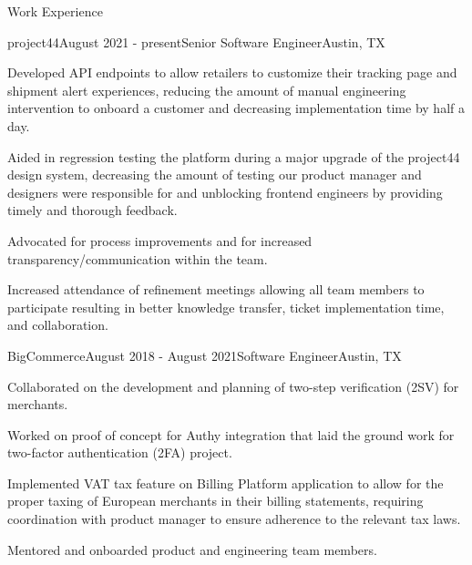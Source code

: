 \documentclass{resume} %
\begin{document}

\begin{rSection}{Work Experience}


\begin{rSubsection}{project44}{August 2021 - present}{Senior Software Engineer}{Austin, TX}
\item Developed API endpoints to allow retailers to customize their tracking page and shipment alert experiences, reducing the
amount of manual engineering intervention to onboard a customer and decreasing implementation time by half a day.
\item Aided in regression testing the platform during a major upgrade of the project44 design system, decreasing the amount of
testing our product manager and designers were responsible for and unblocking frontend engineers by providing timely and thorough
feedback.
\item Advocated for process improvements and for increased transparency/communication within the team.
\item Increased attendance of refinement meetings allowing all team members to participate resulting in better knowledge transfer,
ticket implementation time, and collaboration.
\end{rSubsection}


\begin{rSubsection}{BigCommerce}{August 2018 - August 2021}{Software Engineer}{Austin, TX}
\item Collaborated on the development and planning of two-step verification (2SV) for merchants.
\item Worked on proof of concept for Authy integration that laid the ground work for two-factor authentication (2FA) project.
\item Implemented VAT tax feature on Billing Platform application to allow for the proper taxing of European merchants in their billing
statements, requiring coordination with product manager to ensure adherence to the relevant tax laws.
\item Mentored and onboarded product and engineering team members.
\end{rSubsection}


\end{rSection}
\end{document}
